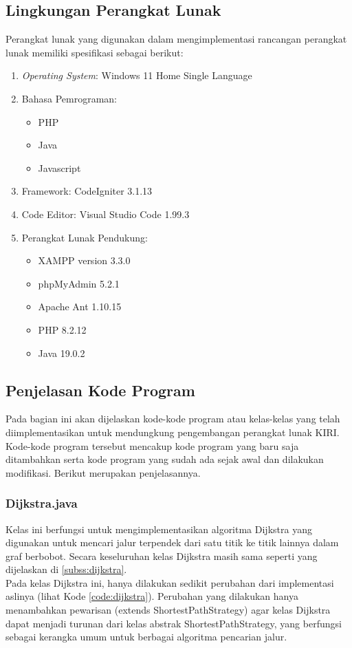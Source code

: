 \subsection{Lingkungan Perangkat Lunak}
\label{subsec:lingkunganperangkatlunak}
Perangkat lunak yang digunakan dalam mengimplementasi rancangan perangkat lunak memiliki spesifikasi sebagai berikut:
\begin{enumerate}
    \item \textit{Operating System}: Windows 11 Home Single Language
    \item Bahasa Pemrograman:
    \begin{itemize}
        \item PHP
        \item Java
        \item Javascript
    \end{itemize}
    \item Framework: CodeIgniter 3.1.13
    \item Code Editor: Visual Studio Code 1.99.3
    \item Perangkat Lunak Pendukung:
    \begin{itemize}
        \item XAMPP version 3.3.0
        \item phpMyAdmin 5.2.1
        \item Apache Ant 1.10.15
        \item PHP 8.2.12
        \item Java 19.0.2
    \end{itemize}
\end{enumerate}

\newpage
\subsection{Penjelasan Kode Program}
\label{subsec:penjelasankode}
Pada bagian ini akan dijelaskan kode-kode program atau kelas-kelas yang telah diimplementasikan untuk mendungkung pengembangan perangkat lunak KIRI. Kode-kode program tersebut mencakup kode program yang baru saja ditambahkan serta kode program yang sudah ada sejak awal dan dilakukan modifikasi. Berikut merupakan penjelasannya.

\subsubsection{Dijkstra.java}
Kelas ini berfungsi untuk mengimplementasikan algoritma Dijkstra yang digunakan untuk mencari jalur terpendek dari satu titik ke titik lainnya dalam graf berbobot. Secara keseluruhan kelas Dijkstra masih sama seperti yang dijelaskan di \ref{subss:dijkstra}.
\\
Pada kelas Dijkstra ini, hanya dilakukan sedikit perubahan dari implementasi aslinya (lihat Kode \ref{code:dijkstra}). Perubahan yang dilakukan hanya menambahkan pewarisan (extends ShortestPathStrategy) agar kelas Dijkstra dapat menjadi turunan dari kelas abstrak ShortestPathStrategy, yang berfungsi sebagai kerangka umum untuk berbagai algoritma pencarian jalur. 

